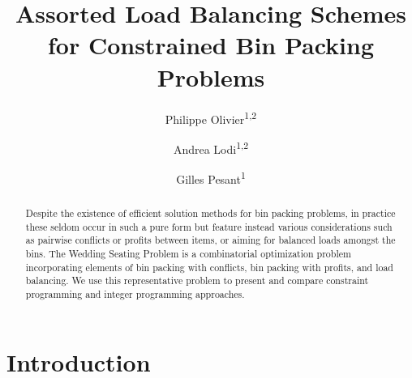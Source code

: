 \documentclass{llncs}
\begin{document}
\title{Assorted Load Balancing Schemes for Constrained Bin Packing Problems}

\author{
  Philippe Olivier\textsuperscript{1,2} \and
  Andrea Lodi\textsuperscript{1,2} \and
  Gilles Pesant\textsuperscript{1}}



\maketitle

\raggedbottom
\allowdisplaybreaks




%

\begin{abstract}
  Despite the existence of efficient solution methods for bin packing problems, in practice these seldom occur in such a pure form but feature instead various considerations such as pairwise conflicts or profits between items, or aiming for balanced loads amongst the bins. The Wedding Seating Problem is a combinatorial optimization problem incorporating elements of bin packing with conflicts, bin packing with profits, and load balancing. We use this representative problem to present and compare constraint programming and integer programming approaches.
\end{abstract}




\section{Introduction}
\label{sec:introduction}
\end{document}

